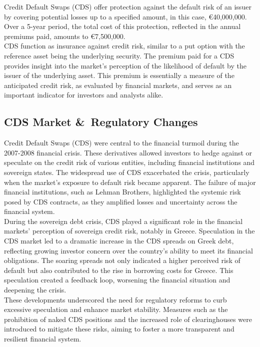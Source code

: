 \documentclass[a4paper,10pt]{article}
\begin{document}
\noindent Credit Default Swaps (CDS) offer protection against the default risk of an issuer by covering potential losses up to a specified amount, in this case, €40,000,000. Over a 5-year period, the total cost of this protection, reflected in the annual premiums paid, amounts to €7,500,000.\\

\noindent CDS function as insurance against credit risk, similar to a put option with the reference asset being the underlying security. The premium paid for a CDS provides insight into the market's perception of the likelihood of default by the issuer of the underlying asset. This premium is essentially a measure of the anticipated credit risk, as evaluated by financial markets, and serves as an important indicator for investors and analysts alike.\\

\subsection{CDS Market \&\ Regulatory Changes}

\noindent Credit Default Swaps (CDS) were central to the financial turmoil during the 2007-2008 financial crisis. These derivatives allowed investors to hedge against or speculate on the credit risk of various entities, including financial institutions and sovereign states. The widespread use of CDS exacerbated the crisis, particularly when the market's exposure to default risk became apparent. The failure of major financial institutions, such as Lehman Brothers, highlighted the systemic risk posed by CDS contracts, as they amplified losses and uncertainty across the financial system.\\

\noindent During the sovereign debt crisis, CDS played a significant role in the financial markets' perception of sovereign credit risk, notably in Greece. Speculation in the CDS market led to a dramatic increase in the CDS spreads on Greek debt, reflecting growing investor concern over the country's ability to meet its financial obligations. The soaring spreads not only indicated a higher perceived risk of default but also contributed to the rise in borrowing costs for Greece. This speculation created a feedback loop, worsening the financial situation and deepening the crisis.\\

\noindent These developments underscored the need for regulatory reforms to curb excessive speculation and enhance market stability. Measures such as the prohibition of naked CDS positions and the increased role of clearinghouses were introduced to mitigate these risks, aiming to foster a more transparent and resilient financial system.\\
\end{document}
